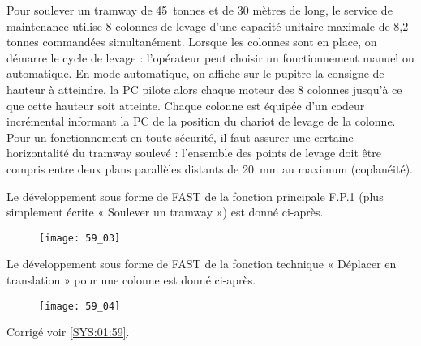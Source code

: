 Pour soulever un tramway de \SI{45}{tonnes} et de 30 mètres de long, le service de maintenance utilise 8
colonnes de levage d'une capacité unitaire maximale de 8,2 tonnes commandées simultanément. Lorsque les colonnes sont en place, on démarre le cycle de levage :
l’opérateur peut choisir un fonctionnement manuel ou automatique. En mode automatique, on
affiche sur le pupitre la consigne de hauteur à atteindre, la PC pilote alors chaque moteur des 8
colonnes jusqu’à ce que cette hauteur soit atteinte. Chaque colonne est équipée d’un codeur
incrémental informant la PC de la position du chariot de levage de la colonne. Pour un
fonctionnement en toute sécurité, il faut assurer une certaine horizontalité du tramway soulevé :
l'ensemble des points de levage doit être compris entre deux plans parallèles distants de \SI{20}{mm} au
maximum (coplanéité).



\begin{multicols}{2}

Le développement sous forme de FAST de la fonction principale F.P.1 (plus simplement écrite
« Soulever un tramway ») est donné ci-après.


\begin{figure}[H]
\centering
\texttt{[image: 59\_03]}
\end{figure}

Le développement sous forme de FAST de la fonction technique « Déplacer en translation » pour
une colonne est donné ci-après.

\begin{figure}[H]
\centering
\texttt{[image: 59\_04]}
\end{figure}
\end{multicols}

\fi




\ifprof
\else
\begin{flushright}
\footnotesize{Corrigé  voir \ref{SYS:01:59}.}
\end{flushright}%
\fi